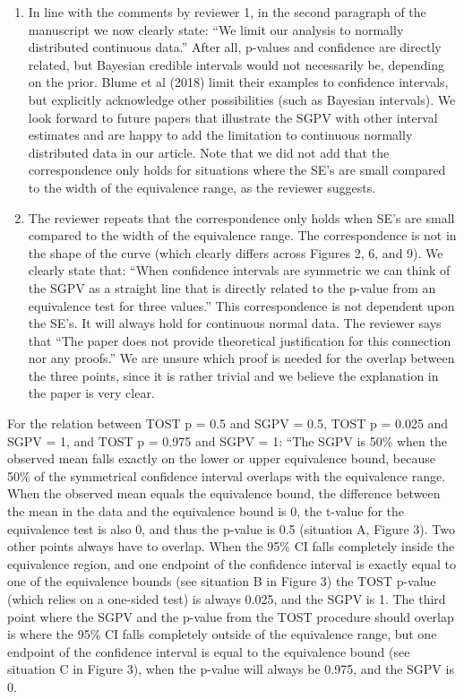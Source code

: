 \documentclass[man]{apa6}
\begin{document}
\begin{enumerate}
\def\labelenumi{\arabic{enumi}.}
\item
  In line with the comments by reviewer 1, in the second paragraph of
  the manuscript we now clearly state: \enquote{We limit our analysis to
  normally distributed continuous data.} After all, p-values and
  confidence are directly related, but Bayesian credible intervals would
  not necessarily be, depending on the prior. Blume et al (2018) limit
  their examples to confidence intervals, but explicitly acknowledge
  other possibilities (such as Bayesian intervals). We look forward to
  future papers that illustrate the SGPV with other interval estimates
  and are happy to add the limitation to continuous normally distributed
  data in our article. Note that we did not add that the correspondence
  only holds for situations where the SE's are small compared to the
  width of the equivalence range, as the reviewer suggests.
\item
  The reviewer repeats that the correspondence only holds when SE's are
  small compared to the width of the equivalence range. The
  correspondence is not in the shape of the curve (which clearly differs
  across Figures 2, 6, and 9). We clearly state that: \enquote{When
  confidence intervals are symmetric we can think of the SGPV as a
  straight line that is directly related to the p-value from an
  equivalence test for three values.} This correspondence is not
  dependent upon the SE's. It will always hold for continuous normal
  data. The reviewer says that \enquote{The paper does not provide
  theoretical justification for this connection nor any proofs.} We are
  unsure which proof is needed for the overlap between the three points,
  since it is rather trivial and we believe the explanation in the paper
  is very clear.
\end{enumerate}

For the relation between TOST p = 0.5 and SGPV = 0.5, TOST p = 0.025 and
SGPV = 1, and TOST p = 0.975 and SGPV = 1: ``The SGPV is 50\% when the
observed mean falls exactly on the lower or upper equivalence bound,
because 50\% of the symmetrical confidence interval overlaps with the
equivalence range. When the observed mean equals the equivalence bound,
the difference between the mean in the data and the equivalence bound is
0, the t-value for the equivalence test is also 0, and thus the p-value
is 0.5 (situation A, Figure 3). Two other points always have to overlap.
When the 95\% CI falls completely inside the equivalence region, and one
endpoint of the confidence interval is exactly equal to one of the
equivalence bounds (see situation B in Figure 3) the TOST p-value (which
relies on a one-sided test) is always 0.025, and the SGPV is 1. The
third point where the SGPV and the p-value from the TOST procedure
should overlap is where the 95\% CI falls completely outside of the
equivalence range, but one endpoint of the confidence interval is equal
to the equivalence bound (see situation C in Figure 3), when the p-value
will always be 0.975, and the SGPV is 0.
\end{document}
